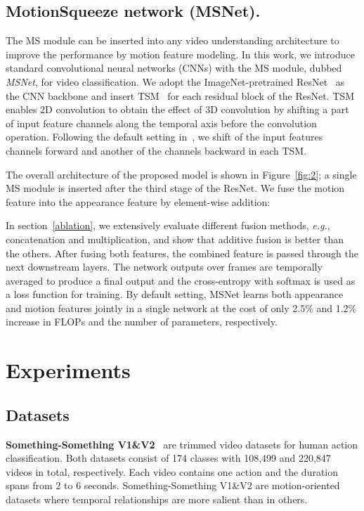 \documentclass[runningheads]{llncs}
\def\eg{\emph{e.g.}}
\begin{document}
\subsection{MotionSqueeze network (MSNet).} 
The MS module can be inserted into any video understanding architecture to improve the performance by motion feature modeling. 
In this work, we introduce standard convolutional neural networks (CNNs) with the MS module, dubbed {\em MSNet}, for video classification.  
We adopt the ImageNet-pretrained ResNet~\cite{he2016deep} as the CNN backbone and insert TSM~\cite{lin2019tsm} for each residual block of the ResNet.
TSM enables 2D convolution to obtain the effect of 3D convolution by shifting a part of input feature channels along the temporal axis before the convolution operation.
Following the default setting in~\cite{lin2019tsm}, we shift  of the input features channels forward and another  of the channels backward in each TSM.

The overall architecture of the proposed model is shown in Figure~\ref{fig:2}; 
a single MS module is inserted after the third stage of the ResNet.
We fuse the motion feature into the appearance feature by element-wise addition:

In section~\ref{ablation}, we extensively evaluate different fusion methods, \eg, concatenation and multiplication, and show that additive fusion is better than the others.
After fusing both features, the combined feature is passed through the next downstream layers.
The network outputs over  frames are temporally averaged to produce a final output and the cross-entropy with softmax is used as a loss function for training.
By default setting, MSNet learns both appearance and motion features jointly in a single network at the cost of only 2.5\% and 1.2\% increase in FLOPs and the number of parameters, respectively. 
\section{Experiments}
\subsection{Datasets}
\textbf{Something-Something V1\&V2}~\cite{goyal2017something} are trimmed video datasets for human action classification.
Both datasets consist of 174 classes with 108,499 and 220,847 videos in total, respectively.
Each video contains one action and the duration spans from 2 to 6 seconds.
Something-Something V1\&V2 are motion-oriented datasets where temporal relationships are more salient than in others.
\end{document}
